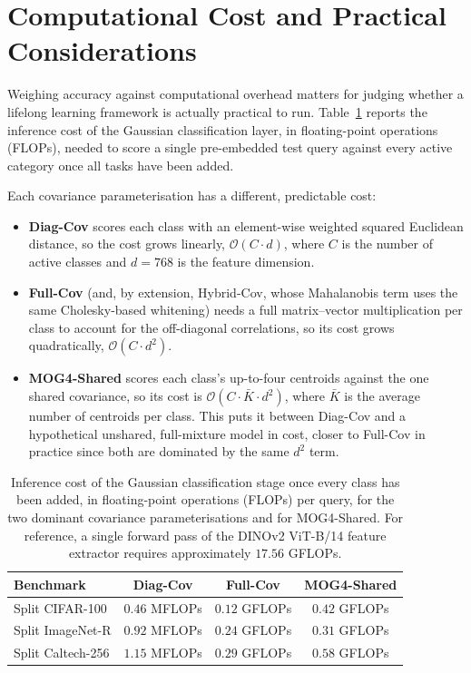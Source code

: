 \section{Computational Cost and Practical Considerations}
\label{sec:computational_requirements}
\label{sec:an:other}

Weighing accuracy against computational overhead matters for judging whether a lifelong learning framework is actually practical to run. Table~\ref{tab:computational_requirements} reports the inference cost of the Gaussian classification layer, in floating-point operations (FLOPs), needed to score a single pre-embedded test query against every active category once all tasks have been added.

Each covariance parameterisation has a different, predictable cost:
\begin{itemize}
	\item \textbf{Diag-Cov} scores each class with an element-wise weighted squared Euclidean distance, so the cost grows linearly, $\mathcal{O}(C \cdot d)$, where $C$ is the number of active classes and $d=768$ is the feature dimension.
	\item \textbf{Full-Cov} (and, by extension, Hybrid-Cov, whose Mahalanobis term uses the same Cholesky-based whitening) needs a full matrix--vector multiplication per class to account for the off-diagonal correlations, so its cost grows quadratically, $\mathcal{O}(C \cdot d^2)$.
	\item \textbf{MOG4-Shared} scores each class's up-to-four centroids against the one shared covariance, so its cost is $\mathcal{O}(C \cdot \bar{K} \cdot d^2)$, where $\bar{K}$ is the average number of centroids per class. This puts it between Diag-Cov and a hypothetical unshared, full-mixture model in cost, closer to Full-Cov in practice since both are dominated by the same $d^2$ term.
\end{itemize}

\begin{table}[htbp]
	\centering
	\caption{Inference cost of the Gaussian classification stage once every class has been added, in floating-point operations (FLOPs) per query, for the two dominant covariance parameterisations and for MOG4-Shared. For reference, a single forward pass of the DINOv2 ViT-B/14 feature extractor requires approximately $17.56$ GFLOPs.}
	\label{tab:computational_requirements}
	\small
	\setlength{\tabcolsep}{8pt}
	\begin{tabular}{lccc}
		\toprule
		\textbf{Benchmark} & \textbf{Diag-Cov} & \textbf{Full-Cov} & \textbf{MOG4-Shared} \\
		\midrule
		Split CIFAR-100   & $0.46$ MFLOPs & $0.12$ GFLOPs & $0.42$ GFLOPs \\
		Split ImageNet-R  & $0.92$ MFLOPs & $0.24$ GFLOPs & $0.31$ GFLOPs \\
		Split Caltech-256 & $1.15$ MFLOPs & $0.29$ GFLOPs & $0.58$ GFLOPs \\
		\bottomrule
	\end{tabular}
\end{table}

